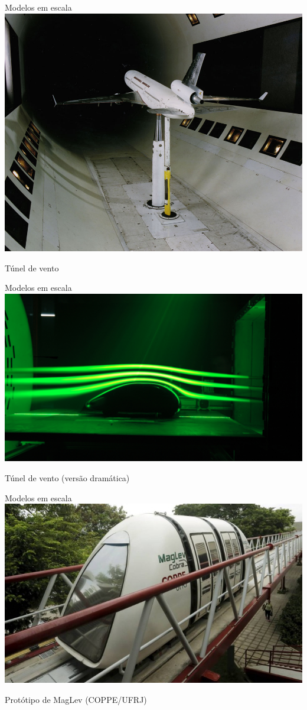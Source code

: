 \documentclass{beamer}
\begin{document}
\begin{frame}{Modelos em escala}
  \centering
  \includegraphics[width=.8\textwidth]{modelos/MD-11_12ft_Wind_Tunnel_Test}

Túnel de vento
\end{frame}

\begin{frame}{Modelos em escala}
  \centering
  \includegraphics[width=\textwidth]{modelos/wind_tunel}

Túnel de vento (versão dramática)
\end{frame}

\begin{frame}{Modelos em escala}
  \centering
  \includegraphics[height=.8\textheight]{modelos/maglev_cobra}

Protótipo de MagLev (COPPE/UFRJ)
\end{frame}
\end{document}
